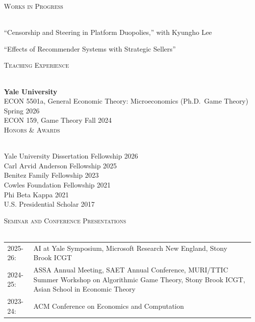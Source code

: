 \documentclass[letterpaper,11pt]{article}
\newcommand{\lineunder} {
    \vspace*{-4pt} \\
	\hrulefill \\
	\vspace{-2pt}
}
\newcommand{\pubsep}{1.5mm}
\newcommand{\pub}[1]{%
    \par\noindent #1\par\vspace{\pubsep}
}
\newcommand{\header} [1] {
    {\vspace*{6pt} \large{\textsc{#1}}}
    \vspace*{-6pt} \lineunder
}
\begin{document}
\vspace{2.5mm}


\header{Works in Progress}

\pub{``Censorship and Steering in Platform Duopolies,'' with Kyungho Lee}

\pub{``Effects of Recommender Systems with Strategic Sellers''}

\vspace{2.5mm}


\header{Teaching Experience}

\textbf{Yale University} \\
ECON 5501a, General Economic Theory: Microeconomics (Ph.D.\ Game Theory) \hfill Spring 2026 \\
ECON 159, Game Theory \hfill Fall 2024 \\[3mm]


\header{Honors \& Awards}

Yale University Dissertation Fellowship \hfill 2026 \\
Carl Arvid Anderson Fellowship \hfill 2025 \\
Benitez Family Fellowship \hfill 2023 \\
Cowles Foundation Fellowship \hfill 2021 \\
Phi Beta Kappa \hfill 2021 \\
U.S. Presidential Scholar \hfill 2017

\vspace{3mm}


\header{Seminar and Conference Presentations}

\vspace{2pt}
\hspace{-11pt}
\def\arraystretch{1.1}
\begin{tabular}{lp{}}
	2025-26:		& AI at Yale Symposium, Microsoft Research New England, Stony Brook ICGT	\\
	2024-25:		& ASSA Annual Meeting, SAET Annual Conference, MURI/TTIC Summer Workshop on Algorithmic Game Theory, Stony Brook ICGT, Asian School in Economic Theory	\\
	2023-24:		& ACM Conference on Economics and Computation
\end{tabular}
\end{document}
